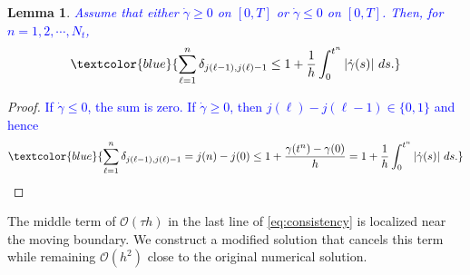 \documentclass[11pt,reqno]{amsart}
\theoremstyle{plain}
\newtheorem{lemma}[theorem]{Lemma}
\theoremstyle{definition}
\numberwithin{equation}{section}
\newcommand{\mc}[1]{\mathcal{#1}}
\newcommand{\abs}[1]{\left\lvert #1 \right\rvert}
\begin{document}
\begin{lemma}\label{lem:delta-sum}
\textcolor{blue}{Assume that either $\dot\gamma\ge 0$ on $[0,T]$ or
$\dot\gamma\le 0$ on $[0,T]$. Then, for $n=1,2,\cdots,N_t$,}
\begin{equation}
    \textcolor{blue}{\sum_{\ell=1}^n\delta_{j(\ell-1), j(\ell)-1}
    \le 1+\frac{1}{h}\int_0^{t^n} \abs{\dot{\gamma}(s)}\,ds.}
\end{equation}
\end{lemma}
\begin{proof}
\textcolor{blue}{If $\dot\gamma\le0$, the sum is zero. If $\dot\gamma\ge0$,
then $j(\ell)-j(\ell-1)\in\{0,1\}$ and hence}
\begin{equation}
    \textcolor{blue}{\sum_{\ell=1}^n\delta_{j(\ell-1),j(\ell)-1}
    =j(n)-j(0)
    \le 1+\frac{\gamma(t^n)-\gamma(0)}{h}
    =1+\frac{1}{h}\int_0^{t^n}\abs{\dot\gamma(s)}\,ds.}
\end{equation}
\end{proof}

The middle term of $\mc{O}(\tau h)$ in the last line of \eqref{eq:consistency} is localized near the moving boundary. We construct a modified solution that cancels this term while remaining $\mc{O}(h^2)$ close to the original numerical solution.
\end{document}
